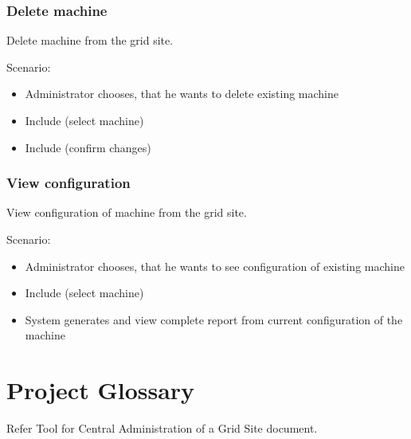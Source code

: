 \documentclass{article}
\begin{document}
\subsubsection{Delete machine}
Delete machine from the grid site.

Scenario:
\begin{itemize}
\item{Administrator chooses, that he wants to delete existing machine}
\item{Include (select machine)}
\item{Include (confirm changes)}
\end{itemize}

\subsubsection{View configuration}
View configuration of machine from the grid site.

Scenario:
\begin{itemize}
\item{Administrator chooses, that he wants to see configuration of existing machine}
\item{Include (select machine)}
\item{System generates and view complete report from current configuration of the machine}
\end{itemize}

\section{Project Glossary}

Refer Tool for Central Administration of a Grid Site document.
\end{document}
